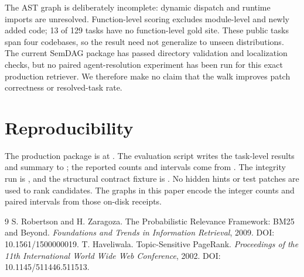 \documentclass[11pt]{article}
\begin{document}
The AST graph is deliberately incomplete: dynamic dispatch and runtime imports are unresolved. Function-level scoring excludes module-level and newly added code; 13 of 129 tasks have no function-level gold site. These public tasks span four codebases, so the result need not generalize to unseen distributions. The current SemDAG package has passed directory validation and localization checks, but no paired agent-resolution experiment has been run for this exact production retriever. We therefore make no claim that the walk improves patch correctness or resolved-task rate.

\section{Reproducibility}
The production package is at . The evaluation script  writes the task-level results and summary to ; the reported counts and intervals come from . The integrity run is , and the structural contract fixture is . No hidden hints or test patches are used to rank candidates. The graphs in this paper encode the integer counts and paired intervals from those on-disk receipts.

\begin{thebibliography}{9}
 S. Robertson and H. Zaragoza. The Probabilistic Relevance Framework: BM25 and Beyond. \emph{Foundations and Trends in Information Retrieval}, 2009. DOI: 10.1561/1500000019.
 T. Haveliwala. Topic-Sensitive PageRank. \emph{Proceedings of the 11th International World Wide Web Conference}, 2002. DOI: 10.1145/511446.511513.
\end{thebibliography}
\end{document}
